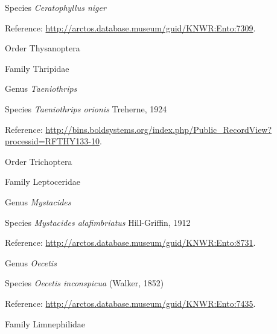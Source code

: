 \documentclass[9pt, article]{memoir}
\begin{document}
\begin{multicols}{2}
\vspace{6pt}\noindent\hspace{36pt}Species \textit{Ceratophyllus niger}


Reference: 
\url{http://arctos.database.museum/guid/KNWR:Ento:7309}.

\vspace{6pt}\noindent\hspace{18pt}Order Thysanoptera


\vspace{6pt}\noindent\hspace{24pt}Family Thripidae


\vspace{6pt}\noindent\hspace{30pt}Genus \textit{Taeniothrips}


\vspace{6pt}\noindent\hspace{36pt}Species \textit{Taeniothrips orionis} Treherne, 1924


Reference: 
\url{http://bins.boldsystems.org/index.php/Public_RecordView?processid=RFTHY133-10}.

\vspace{6pt}\noindent\hspace{18pt}Order Trichoptera


\vspace{6pt}\noindent\hspace{24pt}Family Leptoceridae


\vspace{6pt}\noindent\hspace{30pt}Genus \textit{Mystacides}


\vspace{6pt}\noindent\hspace{36pt}Species \textit{Mystacides alafimbriatus} Hill-Griffin, 1912


Reference: 
\url{http://arctos.database.museum/guid/KNWR:Ento:8731}.

\vspace{6pt}\noindent\hspace{30pt}Genus \textit{Oecetis}


\vspace{6pt}\noindent\hspace{36pt}Species \textit{Oecetis inconspicua} (Walker, 1852)


Reference: 
\url{http://arctos.database.museum/guid/KNWR:Ento:7435}.

\vspace{6pt}\noindent\hspace{24pt}Family Limnephilidae



\end{multicols}
\end{document}
